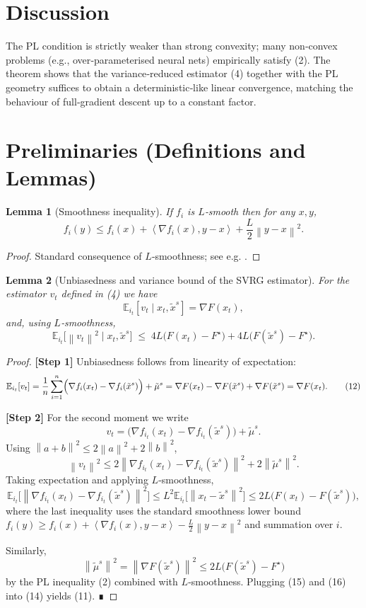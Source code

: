 \documentclass{article}
\newtheorem{lemma}{Lemma}
\newcommand{\E}{\mathbb{E}}
\newcommand{\norm}[1]{\left\|#1\right\|}
\newcommand{\inner}[2]{\left\langle #1,#2\right\rangle}
\begin{document}
\section*{Discussion}
The PL condition is strictly weaker than strong convexity; many non‑convex problems (e.g., over‑parameterised neural nets) empirically satisfy (2). The theorem shows that the variance‑reduced estimator (4) together with the PL geometry suffices to obtain a deterministic‑like linear convergence, matching the behaviour of full‑gradient descent up to a constant factor.

\section*{Preliminaries (Definitions and Lemmas)}
\begin{lemma}[Smoothness inequality]\label{lem:smooth}
If $f_i$ is $L$‑smooth then for any $x,y$,
\[
f_i(y)\le f_i(x)+\inner{\nabla f_i(x)}{y-x}+\frac{L}{2}\norm{y-x}^{2}.
\tag{9}
\]
\end{lemma}
\begin{proof}
Standard consequence of $L$‑smoothness; see e.g. \cite{Nesterov2004}.
\end{proof}

\begin{lemma}[Unbiasedness and variance bound of the SVRG estimator]\label{lem:var}
For the estimator $v_t$ defined in (4) we have
\[
\E_{i_t}[v_t\mid x_t,\tilde{x}^{s}]=\nabla F(x_t),
\tag{10}
\]
and, using $L$‑smoothness,
\[
\E_{i_t}\!\bigl[\norm{v_t}^{2}\mid x_t,\tilde{x}^{s}\bigr]
\;\le\;4L\bigl(F(x_t)-F^{\star}\bigr)+4L\bigl(F(\tilde{x}^{s})-F^{\star}\bigr).
\tag{11}
\]
\end{lemma}
\begin{proof}
\textbf{[Step 1]} Unbiasedness follows from linearity of expectation:
\[
\E_{i_t}[v_t]=\frac{1}{n}\sum_{i=1}^{n}\Bigl(\nabla f_i(x_t)-\nabla f_i(\tilde{x}^{s})\Bigr)+\tilde{\mu}^{s}
=\nabla F(x_t)-\nabla F(\tilde{x}^{s})+\nabla F(\tilde{x}^{s})=\nabla F(x_t).
\tag{12}
\]

\textbf{[Step 2]} For the second moment we write
\[
v_t=\bigl(\nabla f_{i_t}(x_t)-\nabla f_{i_t}(\tilde{x}^{s})\bigr)+\tilde{\mu}^{s}.
\tag{13}
\]
Using $\norm{a+b}^{2}\le2\norm{a}^{2}+2\norm{b}^{2}$,
\[
\norm{v_t}^{2}\le2\norm{\nabla f_{i_t}(x_t)-\nabla f_{i_t}(\tilde{x}^{s})}^{2}
      +2\norm{\tilde{\mu}^{s}}^{2}.
\tag{14}
\]
Taking expectation and applying $L$‑smoothness,
\[
\E_{i_t}\!\bigl[\norm{\nabla f_{i_t}(x_t)-\nabla f_{i_t}(\tilde{x}^{s})}^{2}\bigr]
\le L^{2}\E_{i_t}\!\bigl[\norm{x_t-\tilde{x}^{s}}^{2}\bigr]
\le 2L\bigl(F(x_t)-F(\tilde{x}^{s})\bigr),
\tag{15}
\]
where the last inequality uses the standard smoothness lower bound  
$f_i(y)\ge f_i(x)+\inner{\nabla f_i(x)}{y-x}-\frac{L}{2}\norm{y-x}^{2}$ and summation over $i$.

Similarly,
\[
\norm{\tilde{\mu}^{s}}^{2}= \norm{\nabla F(\tilde{x}^{s})}^{2}
\le 2L\bigl(F(\tilde{x}^{s})-F^{\star}\bigr)
\tag{16}
\]
by the PL inequality (2) combined with $L$‑smoothness.  
Plugging (15) and (16) into (14) yields (11). ∎
\end{proof}
\end{document}
